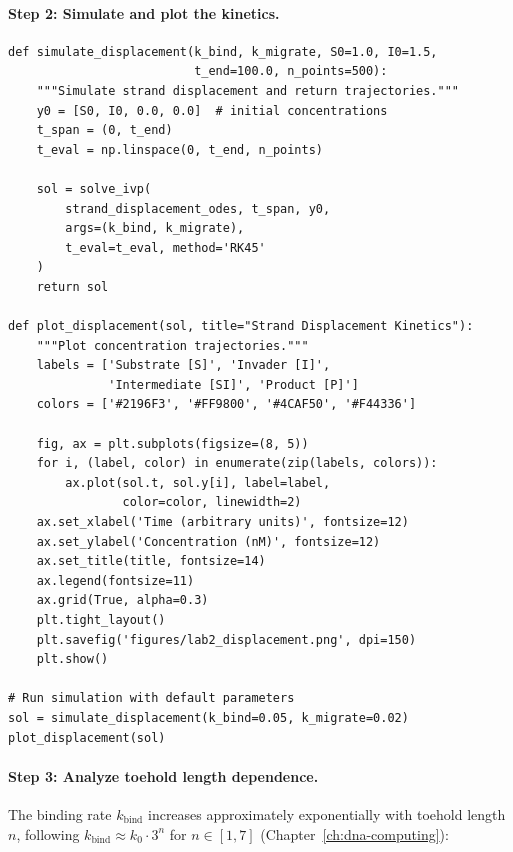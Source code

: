 \paragraph{Step 2: Simulate and plot the kinetics.}

\begin{lstlisting}[style=dogmapython, caption={Lab 2: Running the strand displacement simulation.}]
def simulate_displacement(k_bind, k_migrate, S0=1.0, I0=1.5,
                          t_end=100.0, n_points=500):
    """Simulate strand displacement and return trajectories."""
    y0 = [S0, I0, 0.0, 0.0]  # initial concentrations
    t_span = (0, t_end)
    t_eval = np.linspace(0, t_end, n_points)

    sol = solve_ivp(
        strand_displacement_odes, t_span, y0,
        args=(k_bind, k_migrate),
        t_eval=t_eval, method='RK45'
    )
    return sol

def plot_displacement(sol, title="Strand Displacement Kinetics"):
    """Plot concentration trajectories."""
    labels = ['Substrate [S]', 'Invader [I]',
              'Intermediate [SI]', 'Product [P]']
    colors = ['#2196F3', '#FF9800', '#4CAF50', '#F44336']

    fig, ax = plt.subplots(figsize=(8, 5))
    for i, (label, color) in enumerate(zip(labels, colors)):
        ax.plot(sol.t, sol.y[i], label=label,
                color=color, linewidth=2)
    ax.set_xlabel('Time (arbitrary units)', fontsize=12)
    ax.set_ylabel('Concentration (nM)', fontsize=12)
    ax.set_title(title, fontsize=14)
    ax.legend(fontsize=11)
    ax.grid(True, alpha=0.3)
    plt.tight_layout()
    plt.savefig('figures/lab2_displacement.png', dpi=150)
    plt.show()

# Run simulation with default parameters
sol = simulate_displacement(k_bind=0.05, k_migrate=0.02)
plot_displacement(sol)
\end{lstlisting}

\paragraph{Step 3: Analyze toehold length dependence.}
The binding rate $k_{\text{bind}}$ increases approximately exponentially with toehold length $n$, following $k_{\text{bind}} \approx k_0 \cdot 3^{n}$ for $n \in [1, 7]$ (Chapter~\ref{ch:dna-computing}):

